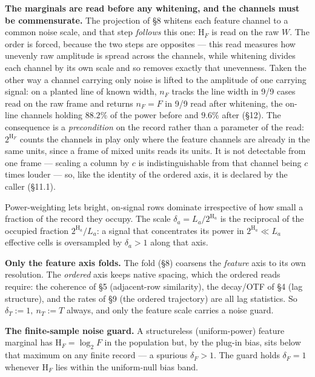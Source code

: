\documentclass[10pt,letterpaper,twocolumn]{article}
\begin{document}
\textbf{The marginals are read before any whitening, and the channels must be commensurate.} The projection of §8 whitens each feature channel to a common noise scale, and that step \emph{follows} this one: \(\mathrm{H}_F\) is read on the raw \(W\). The order is forced, because the two steps are opposites --- this read measures how unevenly raw amplitude is spread across the channels, while whitening divides each channel by its own scale and so removes exactly that unevenness. Taken the other way a channel carrying only noise is lifted to the amplitude of one carrying signal: on a planted line of known width, \(n_F\) tracks the line width in 9/9 cases read on the raw frame and returns \(n_F=F\) in 9/9 read after whitening, the on-line channels holding \(88.2\%\) of the power before and \(9.6\%\) after (§12). The consequence is a \emph{precondition} on the record rather than a parameter of the read: \(2^{\mathrm{H}_F}\) counts the channels in play only where the feature channels are already in the same units, since a frame of mixed units reads its units. It is not detectable from one frame --- scaling a column by \(c\) is indistinguishable from that channel being \(c\) times louder --- so, like the identity of the ordered axis, it is declared by the caller (§11.1).

Power-weighting lets bright, on-signal rows dominate irrespective of how small a fraction of the record they occupy. The scale \(\delta_a=L_a/2^{\mathrm{H}_a}\) is the reciprocal of the occupied fraction \(2^{\mathrm{H}_a}/L_a\): a signal that concentrates its power in \(2^{\mathrm{H}_a}\ll L_a\) effective cells is oversampled by \(\delta_a>1\) along that axis.

\textbf{Only the feature axis folds.} The fold (§8) coarsens the \emph{feature} axis to its own resolution. The \emph{ordered} axis keeps native spacing, which the ordered reads require: the coherence of §5 (adjacent-row similarity), the decay/OTF of §4 (lag structure), and the rates of §9 (the ordered trajectory) are all lag statistics. So \(\delta_T:=1,\ n_T:=T\) always, and only the feature scale carries a noise guard.

\textbf{The finite-sample noise guard.} A structureless (uniform-power) feature marginal has \(\mathrm{H}_F=\log_2 F\) in the population but, by the plug-in bias, sits below that maximum on any finite record --- a spurious \(\delta_F>1\). The guard holds \(\delta_F=1\) whenever \(\mathrm{H}_F\) lies within the uniform-null bias band.
\end{document}

